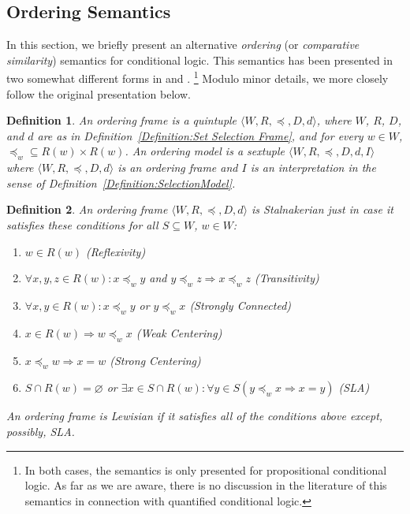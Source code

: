 \documentclass[12pt]{article}
\newtheorem{definition}{Definition}
\newcommand{\tup}[1]{\langle #1 \rangle}
\begin{document}


\subsection{Ordering Semantics}
\label{Subsection:Ordering Semantics}

In this section, we briefly present an alternative \emph{ordering} (or \emph{comparative similarity}) semantics for conditional logic. This semantics has been presented in two somewhat different forms in \cite{Lewis1971} and \cite[\S2.3]{Lewis1973}.%
\footnote{
    In both cases, the semantics is only presented for propositional conditional logic. 
    As far as we are aware, there is no discussion in the literature of this semantics in connection with quantified conditional logic.
    } %
Modulo minor details, we more closely follow the original presentation below.

\begin{definition}
\label{Definition:Ordering frame}
    An \emph{ordering frame} is a quintuple $\tup{W,R,\preceq,D,d}$, where $W$, $R$, $D$, and $d$ are as in Definition~\ref{Definition:Set Selection Frame}, and for every $w\in W$, $\preceq_{w}\subseteq R(w)\times R(w)$. 
    An \emph{ordering model} is a sextuple $\tup{W,R,\preceq,D,d,I}$ where $\tup{W,R,\preceq,D,d}$ is an ordering frame and $I$ is an interpretation in the sense of Definition~\ref{Definition:SelectionModel}. 
\end{definition}

\begin{definition}
    \label{Definition:Stalnakerian Order}
    An ordering frame $\tup{W,R,\preceq,D,d}$ is \emph{Stalnakerian} just in case it satisfies these conditions for all $S\subseteq W$, $w \in W$:
    \begin{enumerate}
        \item $w\in R(w)$ \hfill (Reflexivity)
        \item $\forall x, y, z \in R(w): x\preceq_{w} y$ and $y\preceq_{w}z \Rightarrow x\preceq_{w}z$ \hfill (Transitivity)
        \item $\forall x, y \in R(w): x\preceq_{w} y$ or $y\preceq_{w}x$ \hfill (Strongly Connected)
        \item $x\in R(w) \Rightarrow w\preceq_{w}x$ \hfill (Weak Centering)
        \item $x\preceq_{w}w \Rightarrow x=w$ \hfill (Strong Centering)
        \item $S\cap R(w)= \varnothing$ or $\exists{x}\in S\cap R(w): \forall{y}\in S(y\preceq_{w}x \Rightarrow x=y)$ \hfill (SLA)
    \end{enumerate}
    An ordering frame is \emph{Lewisian} if it satisfies all of the conditions above except, possibly, SLA. 
\end{definition}
\end{document}
